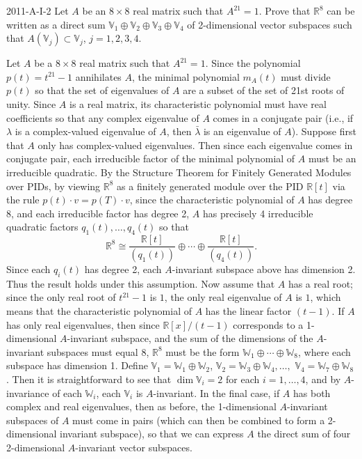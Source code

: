\documentclass{article}
\begin{document}
	\begin{prb}{2011-A-I-2}
		Let $A$ be an $8 \times 8$ real matrix such that $A^{21} = 1$. Prove that $\mathbb{R}^{8}$ can be written as a direct sum $\mathbb{V}_{1} \oplus \mathbb{V}_{2} \oplus \mathbb{V}_{3} \oplus \mathbb{V}_{4}$ of 2-dimensional vector subspaces such that $A(\mathbb{V}_{j}) \subset \mathbb{V}_{j}$, $j = 1, 2, 3, 4$. 
	\end{prb}
	Let $A$ be a $8 \times 8$ real matrix such that $A^{21} = 1$. Since the polynomial $p(t) = t^{21} - 1$ annihilates $A$, the minimal polynomial $m_{A}(t)$ must divide $p(t)$ so that the set of eigenvalues of $A$ are a subset of the set of 21st roots of unity. Since $A$ is a real matrix, its characteristic polynomial must have real coefficients so that any complex eigenvalue of $A$ comes in a conjugate pair (i.e., if $\lambda$ is a complex-valued eigenvalue of $A$, then $\bar{\lambda}$ is an eigenvalue of $A$). Suppose first that $A$ only has complex-valued eigenvalues. Then since each eigenvalue comes in conjugate pair, each irreducible factor of the minimal polynomial of $A$ must be an irreducible quadratic. By the Structure Theorem for Finitely Generated Modules over PIDs, by viewing $\mathbb{R}^{8}$ as a finitely generated module over the PID $\mathbb{R}[t]$ via the rule $p(t) \cdot v = p(T) \cdot v$, since the characteristic polynomial of $A$ has degree 8, and each irreducible factor has degree 2, $A$ has precisely 4 irreducible quadratic factors $q_{1}(t), \ldots, q_{4}(t)$ so that
	\begin{equation*}
		\mathbb{R}^{8} \cong \frac{\mathbb{R}[t]}{(q_{1}(t))} \oplus \dotsm \oplus \frac{\mathbb{R}[t]}{(q_{4}(t))}.
	\end{equation*}
	Since each $q_{i}(t)$ has degree 2, each $A$-invariant subspace above has dimension 2. Thus the result holds under this assumption. Now assume that $A$ has a real root; since the only real root of $t^{21} - 1$ is $1$, the only real eigenvalue of $A$ is $1$, which means that the characteristic polynomial of $A$ has the linear factor $(t -1)$. If $A$ has only real eigenvalues, then since $\mathbb{R}[x]/(t -1)$ corresponds to a 1-dimensional $A$-invariant subspace, and the sum of the dimensions of the $A$-invariant subspaces must equal $8$, $\mathbb{R}^{8}$ must be the form $\mathbb{W}_{1} \oplus \dotsm \oplus \mathbb{W}_{8}$, where each subspace has dimension 1. Define $\mathbb{V}_{1} = \mathbb{W}_{1} \oplus \mathbb{W}_{2}$, $\mathbb{V}_{2} = \mathbb{W}_{3} \oplus \mathbb{W}_{4}, \ldots,$ $\mathbb{V}_{4} = \mathbb{W}_{7} \oplus \mathbb{W}_{8}$. Then it is straightforward to see that $\dim{\mathbb{V}_{i}} = 2$ for each $i = 1, \ldots, 4$, and by $A$-invariance of each $\mathbb{W}_{i}$, each $\mathbb{V}_{i}$ is $A$-invariant. In the final case, if $A$ has both complex and real eigenvalues, then as before, the 1-dimensional $A$-invariant subspaces of $A$ must come in pairs (which can then be combined to form a 2-dimensional invariant subspace), so that we can express $A$ the direct sum of four 2-dimensional $A$-invariant vector subspaces. 
	
\end{document}

